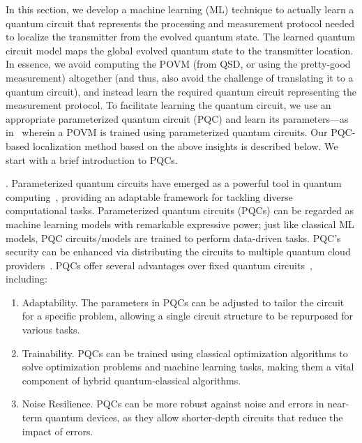 In this section, we develop a machine learning (ML) technique to actually learn a quantum circuit that represents the processing and measurement protocol needed to localize the transmitter from the evolved quantum state.
The learned quantum circuit model maps the global evolved quantum state to the transmitter location.
In essence, we avoid computing the POVM (from QSD, or using the pretty-good measurement) altogether (and thus, also avoid the challenge of translating it to a quantum circuit), and instead learn the required quantum circuit representing the measurement protocol.
To facilitate learning the quantum circuit, we use an appropriate parameterized quantum circuit (PQC) and learn 
its parameters---as in~\cite{PhysRevResearch.qsd-qnn} 
wherein a POVM is trained using parameterized quantum circuits.
Our PQC-based localization method based on the above insights is described
below. We start with a brief introduction to PQCs.

.
Parameterized quantum circuits have emerged as a powerful tool in quantum computing~\cite{Benedetti_2019}, providing an adaptable framework for tackling diverse computational tasks. 
Parameterized quantum circuits (PQCs) can be regarded as machine learning models with remarkable expressive power; just like classical ML models, PQC circuits/models are trained to perform data-driven tasks. 
PQC's security can be enhanced via distributing the circuits to multiple quantum cloud providers~\cite{zhepeng2023}.
PQCs offer several advantages over fixed quantum circuits~\cite{Benedetti_2019, quantumnas2022,quantumnat2022}, including:
\begin{enumerate}
    \item Adaptability. The parameters in PQCs can be adjusted to tailor the circuit for a specific problem, allowing a single circuit structure to be repurposed for various tasks.
    \item Trainability. PQCs can be trained using classical optimization algorithms to solve optimization problems and machine learning tasks, making them a vital component of hybrid quantum-classical algorithms. 
    \item Noise Resilience. PQCs can be more robust against noise and errors in near-term quantum devices, as they allow shorter-depth circuits that reduce the impact of errors. 
\end{enumerate}

